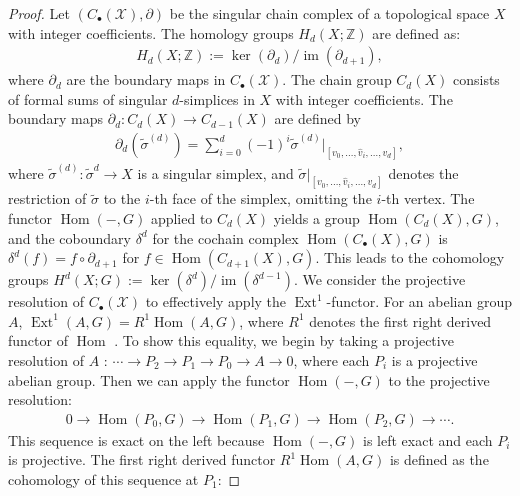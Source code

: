 \begin{proof}
Let $(C_{\bullet}(\mathcal{X}),\partial)$ be the singular chain complex of a topological space $X$ with integer coefficients. The homology groups $H_{d}(X; \mathbb{Z})$ are defined as:
\begin{align}
H_{d}(X; \mathbb{Z}) := \ker(\partial_{d}) / \operatorname{im}(\partial_{d+1}),
\end{align}
where $\partial_{d}$ are the boundary maps in $C_{\bullet}(\mathcal{X})$. The chain group $C_{d}(X)$ consists of formal sums of singular $d$-simplices in $X$ with integer coefficients. The boundary maps $\partial_{d}: C_{d}(X) \rightarrow C_{d-1}(X)$ are defined by
\begin{align}
\partial_{d}(\tilde{\sigma}^{(d)}) = \sum_{i=0}^{d}(-1)^{i} \tilde{\sigma}^{(d)}|_{[v_0, \ldots, \hat{v}_i, \ldots, v_d]},
\end{align}
where $\tilde{\sigma}^{(d)}: \tilde{\sigma}^{d} \rightarrow X$ is a singular simplex, and $\tilde{\sigma}|_{[v_0, \ldots, \hat{v}_i, \ldots, v_d]}$ denotes the restriction of $\tilde{\sigma}$ to the $i$-th face of the simplex, omitting the $i$-th vertex. The functor $\operatorname{Hom}(-, G)$ applied to $C_{d}(X)$ yields a group $\operatorname{Hom}(C_{d}(X), G)$, and the coboundary $\delta^{d}$ for the cochain complex $\operatorname{Hom}(C_{\bullet}(X), G)$ is $\delta^{d}(f) = f \circ \partial_{d+1}$ for $f \in \operatorname{Hom}(C_{d+1}(X), G)$. This leads to the cohomology groups $H^{d}(X; G) := \ker(\delta^{d}) / \operatorname{im}(\delta^{d-1})$. We consider the projective resolution of $C_{\bullet}(\mathcal{X})$ to effectively apply the $\operatorname{Ext}^1$-functor. For an abelian group $A$, $\operatorname{Ext}^{1}(A, G) = R^{1} \operatorname{Hom}(A, G)$, where $R^{1}$ denotes the first right derived functor of $\operatorname{Hom}$ \cite[Vista 3.4.6, \S 3.5]{Weibel1994}. To show this equality, we begin by taking a projective resolution of $A$ \cite[Definition 2.2.4]{Weibel1994}: $\cdots \to P_{2} \to P_{1} \to P_{0} \to A \to 0$, where each $P_{i}$ is a projective abelian group. Then we can apply the functor $\operatorname{Hom}(-, G)$ to the projective resolution:
\begin{align}
0 \to \operatorname{Hom}(P_{0}, G) \to \operatorname{Hom}(P_{1}, G) \to \operatorname{Hom}(P_{2}, G) \to \cdots.
\end{align}
This sequence is exact on the left because $\operatorname{Hom}(-, G)$ is left exact and each $P_{i}$ is projective. The first right derived functor $R^{1}\operatorname{Hom}(A, G)$ is defined as the cohomology of this sequence at $P_{1}$:

\end{proof}
